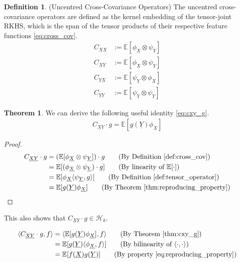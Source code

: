 \documentclass[twoside]{article} \usepackage{aistats2017}
\theoremstyle{definition}
\newtheorem{definition}{Definition}[section]
\theoremstyle{definition}
\newtheorem{theorem}{Theorem}[section]
\theoremstyle{remark}
\newcommand{\rv}[1]{\underline{#1}}
\newcommand{\expect}[1]{{\mathbb{E}[#1]}}
\newcommand{\inner}[2]{{\langle #1, #2 \rangle}}
\newcommand{\phiX}{\phi_{\rv{X}}}
\newcommand{\psiY}{\psi_{\rv{Y}}}
\newcommand{\Cxy}{{C_{\rv{X} \rv{Y}}}}
\newcommand{\Cyx}{{C_{\rv{Y} \rv{X}}}}
\newcommand{\Cxx}{{C_{\rv{X} \rv{X}}}}
\newcommand{\Cyy}{{C_{\rv{Y} \rv{Y}}}}
\begin{document}
	\begin{definition} \label{def:cross_cov}
		(Uncentred Cross-Covariance Operators)
		The uncentred cross-covariance operators are defined as the kernel embedding of the tensor-joint RKHS, which is the span of the tensor products of their respective feature functions \eqref{eq:cross_cov}.
		\begin{equation}
		\begin{aligned}
			\Cxx &:= \expect{\phiX \otimes \psiY} \\
			\Cxy &:= \expect{\phiX \otimes \psiY} \\
			\Cyx &:= \expect{\psiY \otimes \phiX} \\
			\Cyy &:= \expect{\psiY \otimes \psiY}
		\label{eq:cross_cov}
		\end{aligned}
		\end{equation}		
	\end{definition}

	\begin{theorem} \label{thm:cxy_g}
		We can derive the following useful identity \eqref{eq:cxy_g}.
		\begin{equation}
		\begin{aligned}
			\Cxy \cdot g = \expect{g(\rv{Y}) \phiX}
		\label{eq:cxy_g}
		\end{aligned}
		\end{equation}
	
		\begin{proof}
		\begin{align*}
			\Cxy \cdot g &=  (\expect{\phiX \otimes \psiY}) \cdot g \tag{By Definition \ref{def:cross_cov}} \\
			&= \expect{(\phiX \otimes \psiY) \cdot g} \tag{By linearity of $\expect{\cdot}$} \\
			&= \expect{\phiX \inner{\psiY}{g}} \tag{By Definition \ref{def:tensor_operator}} \\
			&= \expect{g(\rv{Y}) \phiX} \tag{By Theorem \ref{thm:reproducing_property}}
		\end{align*}
		\end{proof}
		
		This also shows that $\Cxy \cdot g \in \mathcal{H}_{k}$.
	\end{theorem}
		
		
		\begin{align*}
			\inner{\Cxy \cdot g}{f} &= \inner{\expect{g(\rv{Y}) \phiX}}{f} \tag{By Theorem \ref{thm:cxy_g}}\\
			&= \expect{g(\rv{Y}) \inner{\phiX}{f}} \tag{By bilinearity of $\inner{\cdot}{\cdot}$} \\
			&= \expect{f(\rv{X}) g(\rv{Y})} \tag{By property \eqref{eq:reproducing_property}}
		\end{align*}	
			
\end{document}
